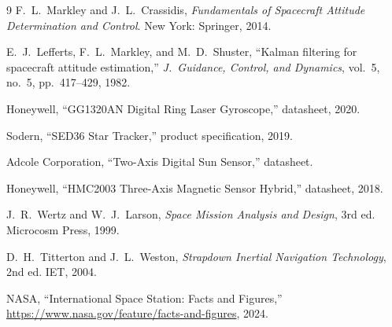 \documentclass[conference]{IEEEtran}
\begin{document}
\begin{thebibliography}{9}
F.~L.~Markley and J.~L.~Crassidis,
\textit{Fundamentals of Spacecraft Attitude Determination and Control}.
New York: Springer, 2014.

E.~J.~Lefferts, F.~L.~Markley, and M.~D.~Shuster,
``Kalman filtering for spacecraft attitude estimation,''
\textit{J.~Guidance, Control, and Dynamics}, vol.~5, no.~5, pp.~417--429, 1982.

Honeywell, ``GG1320AN Digital Ring Laser Gyroscope,'' datasheet, 2020.

Sodern, ``SED36 Star Tracker,'' product specification, 2019.

Adcole Corporation, ``Two-Axis Digital Sun Sensor,'' datasheet.

Honeywell, ``HMC2003 Three-Axis Magnetic Sensor Hybrid,'' datasheet, 2018.

J.~R.~Wertz and W.~J.~Larson,
\textit{Space Mission Analysis and Design}, 3rd ed.
Microcosm Press, 1999.

D.~H.~Titterton and J.~L.~Weston,
\textit{Strapdown Inertial Navigation Technology}, 2nd ed.
IET, 2004.

NASA, ``International Space Station: Facts and Figures,''
\url{https://www.nasa.gov/feature/facts-and-figures}, 2024.
\end{thebibliography}
\end{document}
